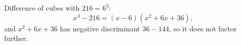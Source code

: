 Difference of cubes with $216=6^3$:
\[x^3-216=\boxed{(x-6)\left(x^2+6x+36\right)},\]
and $x^2+6x+36$ has negative discriminant $36-144$, so it does not factor further.
